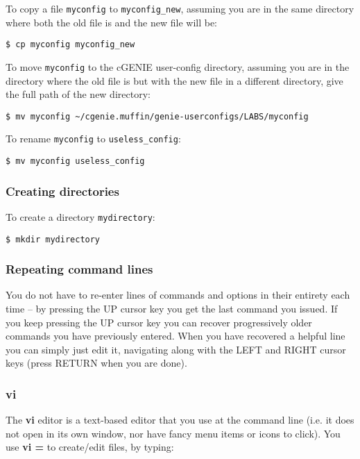 \documentclass[11pt,fleqn]{book} %
\begin{document}
To copy a file \texttt{myconfig} to \texttt{myconfig\_new}, assuming you are in the same directory where both the old file is and the new file will be:
\begin{verbatim}
$ cp myconfig myconfig_new
\end{verbatim}

To move \texttt{myconfig} to the cGENIE user-config directory, assuming you are in the directory where the old file is but with the new file in a different directory, give the full path of the new directory:
\begin{verbatim}
$ mv myconfig ~/cgenie.muffin/genie-userconfigs/LABS/myconfig
\end{verbatim}

To rename \texttt{myconfig} to \texttt{useless\_config}:
\begin{verbatim}
$ mv myconfig useless_config
\end{verbatim}

%
\subsubsection{Creating directories}

To create a directory \texttt{mydirectory}:
\begin{verbatim}
$ mkdir mydirectory
\end{verbatim}

%
\subsubsection{Repeating command lines}

You do not have to re-enter lines of commands and options in their entirety each time – by pressing the UP cursor key you get the last command you issued. If you keep pressing the UP cursor key you can recover progressively older commands you have previously entered. When you have recovered a helpful line you can simply just edit it, navigating along with the LEFT and RIGHT cursor keys (press RETURN when you are done).

%
\subsubsection{vi}

The \textbf{vi} editor is a text-based editor that you use at the command line (i.e. it does not open in its own window, nor have fancy menu items or icons to click). You use \textbf{vi =} to create/edit files, by typing:
\end{document}
